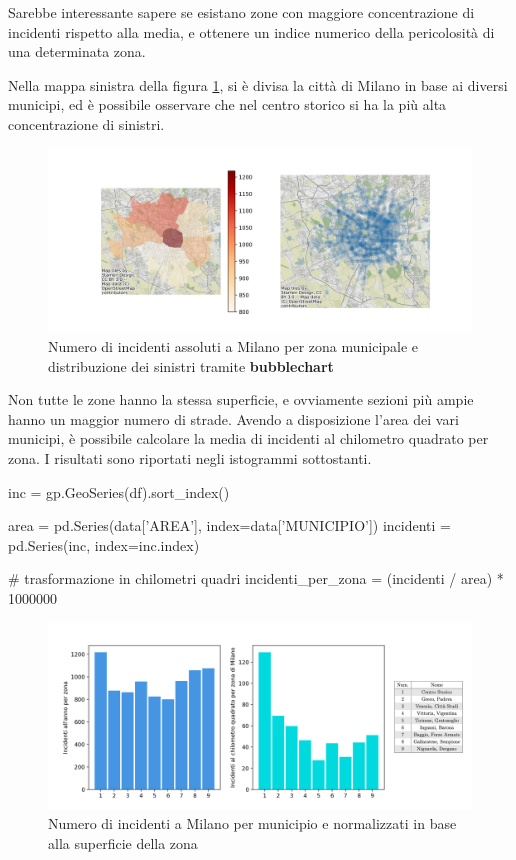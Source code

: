 \documentclass[a4paper]{report}
\newcommand{\engstyle}[1]{\textbf{#1}}
\begin{document}
Sarebbe interessante sapere se esistano zone con maggiore concentrazione 
di incidenti rispetto alla media, e ottenere un indice numerico 
della pericolosità di una determinata zona. 

Nella mappa sinistra della figura \ref{fig:heatmap-municipi}, si è divisa 
la città di Milano in base ai diversi municipi, ed è possibile 
osservare che nel centro storico si ha la più alta concentrazione di sinistri. 

\begin{figure}
    \includegraphics[width=\linewidth]{../src/municipi_milano/incidenti_municipio.png}
    \caption{Numero di incidenti assoluti a Milano per zona municipale e distribuzione dei sinistri tramite \engstyle{bubblechart}}
    \label{fig:heatmap-municipi}
\end{figure}

Non tutte le zone hanno la stessa superficie, e ovviamente sezioni più ampie hanno un maggior 
numero di strade. Avendo a disposizione l'area dei vari municipi, 
è possibile calcolare la media di incidenti al chilometro quadrato per zona. 
I risultati sono riportati negli istogrammi sottostanti. 

\begin{code}    
inc = gp.GeoSeries(df).sort_index()

area = pd.Series(data['AREA'], index=data['MUNICIPIO'])
incidenti = pd.Series(inc, index=inc.index)

# trasformazione in chilometri quadri
incidenti_per_zona = (incidenti / area) * 1000000 
\end{code}

\begin{figure}
    \includegraphics[width=\linewidth]{../src/municipi_milano/incidenti_superf.png}
    \caption{Numero di incidenti a Milano per municipio e normalizzati in base alla 
    superficie della zona}
    \label{fig:incidenti-chilometro}
\end{figure}
\end{document}
